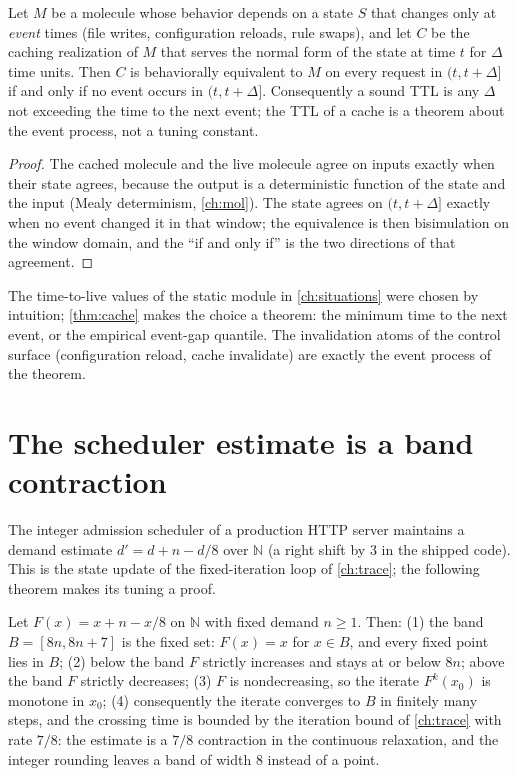 \begin{theorem}\label{thm:cache}
Let $M$ be a molecule whose behavior depends on a state $S$ that
changes only at \emph{event} times (file writes, configuration
reloads, rule swaps), and let $C$ be the caching realization of $M$
that serves the normal form of the state at time $t$ for $\Delta$ time
units. Then $C$ is behaviorally equivalent to $M$ on every request in
$(t, t+\Delta]$ if and only if no event occurs in $(t, t+\Delta]$.
Consequently a sound TTL is any $\Delta$ not exceeding the time to the
next event; the TTL of a cache is a theorem about the event process,
not a tuning constant.
\end{theorem}

\begin{proof}
The cached molecule and the live molecule agree on inputs exactly when
their state agrees, because the output is a deterministic function of
the state and the input (Mealy determinism, \autoref{ch:mol}). The
state agrees on $(t, t+\Delta]$ exactly when no event changed it in
that window; the equivalence is then bisimulation on the window
domain, and the ``if and only if'' is the two directions of that
agreement.
\end{proof}

\begin{remark}
The time-to-live values of the static module in \autoref{ch:situations}
were chosen by intuition; \autoref{thm:cache} makes the choice a
theorem: the minimum time to the next event, or the empirical
event-gap quantile. The invalidation atoms of the control surface
(configuration reload, cache invalidate) are exactly the event process
of the theorem.
\end{remark}

\section{The scheduler estimate is a band contraction}\label{sec:scheduler}

The integer admission scheduler of a production HTTP server maintains
a demand estimate $d' = d + n - d/8$ over $\mathbb{N}$ (a right shift
by 3 in the shipped code). This is the state update of the
fixed-iteration loop of \autoref{ch:trace}; the following theorem makes
its tuning a proof.

\begin{theorem}\label{thm:ema}
Let $F (x) = x + n - x/8$ on $\mathbb{N}$ with fixed demand
$n \geq 1$. Then:
(1) the band $B = [8n, 8n+7]$ is the fixed set: $F (x) = x$ for
$x \in B$, and every fixed point lies in $B$;
(2) below the band $F$ strictly increases and stays at or below $8n$;
above the band $F$ strictly decreases;
(3) $F$ is nondecreasing, so the iterate $F^{k} (x_0)$ is monotone in
$x_0$;
(4) consequently the iterate converges to $B$ in finitely many steps,
and the crossing time is bounded by the iteration bound of
\autoref{ch:trace} with rate $7/8$: the estimate is a $7/8$
contraction in the continuous relaxation, and the integer rounding
leaves a band of width $8$ instead of a point.
\end{theorem}

